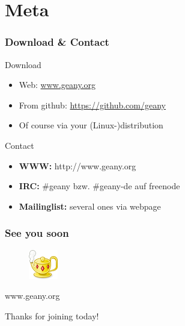 \documentclass[compress]{beamer}
\begin{document}
	\section{Meta}
	\begin{frame}
		\frametitle{Download \& Contact}
		\begin{block}{Download}
			\begin{itemize}
				\item Web: \url{www.geany.org}
				\item From github: \url{https://github.com/geany}
				\item Of course via your (Linux-)distribution
			\end{itemize}
		\end{block}
		\begin{block}{Contact}
			\begin{itemize}
				\item \textbf{WWW:} http://www.geany.org
				\item \textbf{IRC:} \#geany bzw. \#geany-de auf freenode
				\item \textbf{Mailinglist:} several ones via webpage
			\end{itemize}
		\end{block}
	\end{frame}

	\begin{frame}[plain]
		\frametitle{See you soon}
		\begin{figure}[ht]
			\includegraphics{../../img/geany.png}
		\end{figure}

		\begin{center}
			\huge www.geany.org
		\end{center}
		\begin{center}
			\huge Thanks for joining today!
		\end{center}
	\end{frame}
\end{document}
